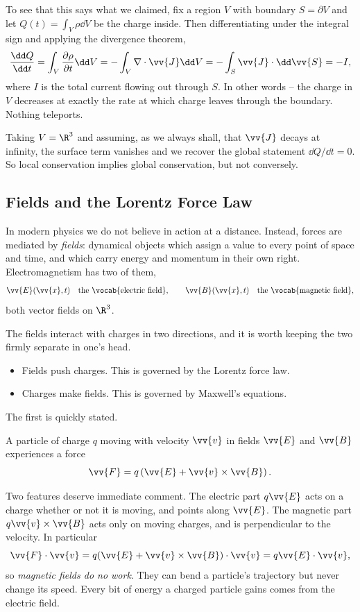 To see that this says what we claimed, fix a region $V$ with boundary $S = \partial V$ and let $Q(t) = \int_V \rho \dd V$ be the charge inside. Then differentiating under the integral sign and applying the divergence theorem,
$$
\frac{\dd Q}{\dd t} = \int_V \frac{\partial \rho}{\partial t} \dd V = -\int_V \nabla \cdot \vv{J} \dd V = - \int_S \vv{J} \cdot \dd \vv{S} = -I,
$$
where $I$ is the total current flowing out through $S$. In other words -- the charge in $V$ decreases at exactly the rate at which charge leaves through the boundary. Nothing teleports.

Taking $V = \R^3$ and assuming, as we always shall, that $\vv{J}$ decays at infinity, the surface term vanishes and we recover the global statement $\dd Q/\dd t = 0$. So local conservation implies global conservation, but not conversely.

\subsection{Fields and the Lorentz Force Law}

In modern physics we do not believe in action at a distance. Instead, forces are mediated by \emph{fields}: dynamical objects which assign a value to every point of space and time, and which carry energy and momentum in their own right. Electromagnetism has two of them,
$$
\vv{E}(\vv{x}, t) \quad \text{the \vocab{electric field}}, \qquad \vv{B}(\vv{x}, t) \quad \text{the \vocab{magnetic field}},
$$
both vector fields on $\R^3$.

The fields interact with charges in two directions, and it is worth keeping the two firmly separate in one's head.
\begin{itemize}
	\item Fields push charges. This is governed by the Lorentz force law.
	\item Charges make fields. This is governed by Maxwell's equations.
\end{itemize}

The first is quickly stated.

\begin{law}
	A particle of charge $q$ moving with velocity $\vv{v}$ in fields $\vv{E}$ and $\vv{B}$ experiences a force
	$$
	\vv{F} = q\left(\vv{E} + \vv{v} \times \vv{B}\right).
	$$
\end{law}

Two features deserve immediate comment. The electric part $q\vv{E}$ acts on a charge whether or not it is moving, and points along $\vv{E}$. The magnetic part $q \vv{v} \times \vv{B}$ acts only on moving charges, and is perpendicular to the velocity. In particular
$$
\vv{F} \cdot \vv{v} = q(\vv{E} + \vv{v}\times \vv{B})\cdot \vv{v} = q \vv{E}\cdot \vv{v},
$$
so \emph{magnetic fields do no work}. They can bend a particle's trajectory but never change its speed. Every bit of energy a charged particle gains comes from the electric field.

